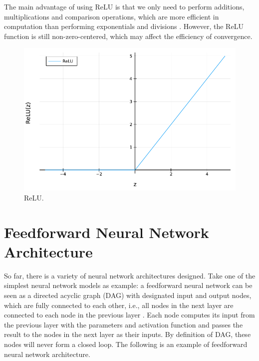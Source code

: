 \documentclass[
	parskip, 			   %
	twoside, 			   %
	DIV=14, 			   %
	BCOR=15.0mm, 		   %
	headsepline, 		   %
	open=right, 		   %
	captions=tableheading, %
	bibliography=totoc,    %
	numbers=noenddot       %
]{scrreprt}
\begin{document}
The main advantage of using ReLU is that we only need to perform additions, multiplications and comparison operations, which are more efficient in computation than performing exponentials and divisions \cite{nwankpa2018activation}. However, the ReLU function is still non-zero-centered, which may affect the efficiency of convergence. 

\begin{figure}[h!]
    \centering
    \includegraphics[scale=0.7]{figures/ReLU.pdf}
    \caption{ReLU.}
    \label{fig:ReLU}
\end{figure}


\section{Feedforward Neural Network Architecture}
So far, there is a variety of neural network architectures designed. Take one of the simplest neural network models as example: a feedforward neural network can be seen as a directed acyclic graph (DAG) with designated input and output nodes, which are fully connected to each other, i.e., all nodes in the next layer are connected to each node in the previous layer \cite{russell2010artificial}. Each node computes its input from the previous layer with the parameters and activation function and passes the result to the nodes in the next layer as their inputs. By definition of DAG, these nodes will never form a closed loop. The following is an example of feedforward neural network architecture.
\end{document}
